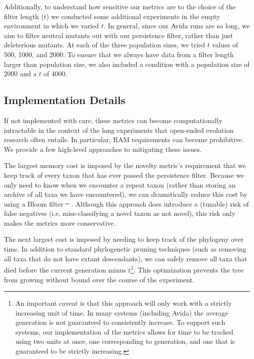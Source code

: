 \documentclass[letterpaper]{article}
\providecommand{\DIFaddtex}[1]{{\protect\color{blue}\uwave{#1}}} %
\providecommand{\DIFdeltex}[1]{{\protect\color{red}\sout{#1}}}                      %
\providecommand{\DIFaddbegin}{} %
\providecommand{\DIFaddend}{} %
\providecommand{\DIFdelbegin}{} %
\providecommand{\DIFdelend}{} %
\providecommand{\DIFadd}[1]{\texorpdfstring{\DIFaddtex{#1}}{#1}} %
\providecommand{\DIFdel}[1]{\texorpdfstring{\DIFdeltex{#1}}{}} %
\begin{document}
Additionally, to understand how sensitive our metrics are to the choice of the filter length ($t$) we conducted some additional experiments in the empty environment in which we varied $t$. In general, since our Avida runs are so long, we aim to filter neutral mutants out with our persistence filter, rather than just deleterious mutants. At each of the three population sizes, we tried $t$ values of 500, 1000, and 2000. To ensure that we always have data from a filter length larger than population size, we also included a condition with a population size of 2000 and a $t$ of 4000.

\subsection{Implementation Details}
If not implemented with care, these metrics can become computationally intractable in the context of the long experiments that open-ended evolution research often entails. In particular, RAM requirements can become prohibitive. We provide a few high-level approaches to mitigating these issues.

The largest memory cost is imposed by the novelty metric's requirement that we keep track of every taxon that has ever passed the persistence filter. Because we only need to know when we encounter a repeat taxon (rather than storing an archive of all taxa we have encountered), we can dramatically reduce this cost by using a Bloom filter \DIFdelbegin \DIFdel{\mbox{%
\citep{Bloom:1970:STH:362686.362692}}\hspace{0pt}%
}\DIFdelend \DIFaddbegin \DIFadd{\mbox{%
\citep{bloom_space/time_1970}}\hspace{0pt}%
}\DIFaddend . Although this approach does introduce a (tunable) risk of false negatives (i.e. miss-classifying a novel taxon as not novel), this risk only makes the metrics more conservative. 

The next largest cost is imposed by needing to keep track of the phylogeny over time. In addition to standard phylogenetic pruning techniques (such as removing all taxa that do not have extant descendants), we can safely remove all taxa that died before the current generation minus $t$\footnote{An important caveat is that this approach will only work with a strictly increasing unit of time. In many systems (including Avida) the average generation is not guaranteed to consistently increase. To support such systems, our implementation of the metrics allows for time to be tracked using two units at once, one corresponding to generation, and one that is guaranteed to be strictly increasing.}. This optimization prevents the tree from growing without bound over the course of the experiment.
\end{document}

